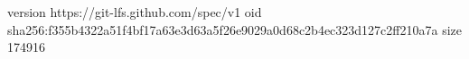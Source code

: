 version https://git-lfs.github.com/spec/v1
oid sha256:f355b4322a51f4bf17a63e3d63a5f26e9029a0d68c2b4ec323d127c2ff210a7a
size 174916
